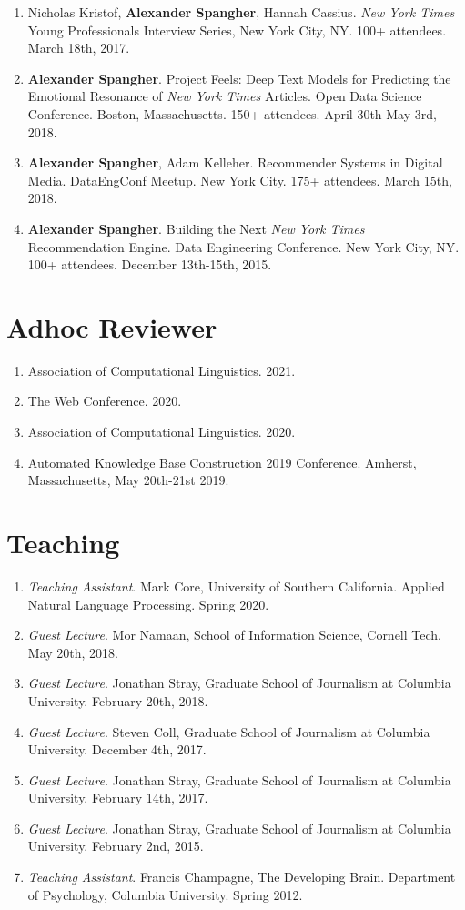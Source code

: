\documentclass[margin]{res}
\begin{document}
\begin{resume}
\begin{enumerate}
	\item Nicholas Kristof, \textbf{Alexander Spangher}, Hannah Cassius. \textit{New York Times} Young Professionals Interview Series, New York City, NY. 100+ attendees. March 18th, 2017.
	\item \textbf{Alexander Spangher}. Project Feels: Deep Text Models for Predicting the Emotional Resonance of \textit{New York Times} Articles. Open Data Science Conference. Boston, Massachusetts. 150+ attendees. April 30th-May 3rd, 2018.
	\item \textbf{Alexander Spangher}, Adam Kelleher. Recommender Systems in Digital Media. DataEngConf Meetup. New York City. 175+ attendees. March 15th, 2018.
	\item \textbf{Alexander Spangher}. Building the Next \textit{New York Times} Recommendation Engine. Data Engineering Conference. New York City, NY. 100+ attendees. December 13th-15th, 2015.
\end{enumerate}

\section{Adhoc Reviewer}
\begin{enumerate}
	\item Association of Computational Linguistics. 2021.
	\item The Web Conference. 2020.
	\item Association of Computational Linguistics. 2020.
	\item Automated Knowledge Base Construction  2019 Conference. Amherst, Massachusetts, May 20th-21st 2019.
\end{enumerate}

\section{Teaching}
\begin{enumerate}
	\item \textit{Teaching Assistant}. Mark Core, University of Southern California. Applied Natural Language Processing. Spring 2020.
	\item \textit{Guest Lecture}. Mor Namaan, School of Information Science, Cornell Tech. May 20th, 2018.
	\item \textit{Guest Lecture}. Jonathan Stray, Graduate School of Journalism at Columbia University. February 20th, 2018.
	\item \textit{Guest Lecture}. Steven Coll, Graduate School of Journalism at Columbia University. December 4th, 2017. 
	\item \textit{Guest Lecture}. Jonathan Stray, Graduate School of Journalism at Columbia University. February 14th, 2017. 
	\item \textit{Guest Lecture}. Jonathan Stray, Graduate School of Journalism at Columbia University. February 2nd, 2015.
	\item \textit{Teaching Assistant}. Francis Champagne, The Developing Brain. Department of Psychology, Columbia University. Spring 2012.
\end{enumerate}


\end{resume}
\end{document}
